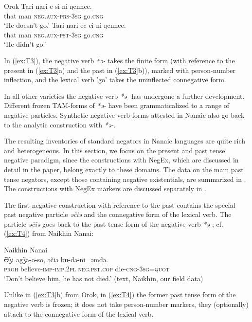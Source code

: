 \documentclass[output=paper,colorlinks,citecolor=brown]{langscibook}
\begin{document}
\ea Orok \label{ex:T3}
  \ea
	\gll Tari	nari	e-si-ni	ŋennee.\\
	that	man	\textsc{neg.aux-prs-3sg}	go.\textsc{cng}\\
    \glt `He doesn’t go.' \citep[13]{tsumagari2009a}
  \ex
	\gll Tari	nari	ec-ci-ni	ŋennee.\\
	that	man	\textsc{neg.aux-pst-3sg}	go.\textsc{cng}\\
	\glt `He didn’t go.' \citep[13]{tsumagari2009a}
\z \z

In (\ref{ex:T3}), the negative verb \textit{*ə-} takes the finite form (with reference to the present in (\ref{ex:T3}a) and the past in (\ref{ex:T3}b)), marked with person-number inflection, and the lexical verb 'go’ takes the uninflected connegative form.

In all other varieties the negative verb \textit{*ə-} has undergone a further development. Different frozen TAM-forms of \textit{*ə-} have been grammaticalized to a range of negative particles. Synthetic negative verb forms attested in Nanaic also go back to the analytic construction with \textit{*ə-}.

The resulting inventories of standard negators in Nanaic languages are quite rich and heterogeneous. In this section, we focus on the present and past tense negative paradigm, since the constructions with NegEx, which are discussed in detail in the paper, belong exactly to these domains. The data on the main past tense negators, except those containing negative existentials, are summarized in . The constructions with NegEx markers are discussed separately in .

The first negative construction with reference to the past contains the special past negative particle \textit{əčiə} and the connegative form of the lexical verb. The particle \textit{əčiə} goes back to the past tense form of the negative verb \textit{*ə-}; cf. (\ref{ex:T4}) from Naikhin Nanai:

\ea Naikhin Nanai \label{ex:T4}\\
	\gll Əǯi		agǯa-o-so,			əčiə				bu-də-ni=əmdə.\\
	\textsc{proh}	believe-\textsc{imp}-\textsc{imp.2pl}	\textsc{neg.pst.cop}	die-\textsc{cng-3sg=quot}\\
	\glt `Don’t believe him, he has not died.' (text, Naikhin, our field data)
\z

Unlike in (\ref{ex:T3}b) from Orok, in (\ref{ex:T4}) the former past tense form of the negative verb is frozen; it does not take person-number markers, they (optionally) attach to the connegative form of the lexical verb.
\end{document}
